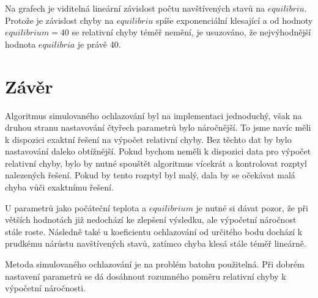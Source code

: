 \documentclass[10pt,a4paper]{article}
\begin{document}
Na grafech je viditelná lineární závislost počtu navštívených stavů na $equilibriu$. Protože je závislost chyby na $equilibriu$ spíše exponenciální klesající a od hodnoty $equilibrium = 40$ se relativní chyby téměř nemění, je usuzováno, že nejvýhodnější hodnota $equilibria$ je právě 40.

\section{Závěr}  
Algoritmus simulovaného ochlazování byl na implementaci jednoduchý, však na druhou stranu nastavování čtyřech parametrů bylo náročnější. To jsme navíc měli k dispozici exaktní řešení na výpočet relativní chyby. Bez těchto dat by bylo nastavování daleko obtížnější. Pokud bychom neměli k dispozici data pro výpočet relativní chyby, bylo by nutné spouštět algoritmus vícekrát a kontrolovat rozptyl nalezených řešení. Pokud by tento rozptyl byl malý, dala by se očekávat malá chyba vůči exaktnímu řešení.

U parametrů jako počáteční teplota a $equilibrium$ je nutné si dávat pozor, že při větších hodnotách již nedochází ke zlepšení výsledku, ale výpočetní náročnost stále roste. Následně také u koeficientu ochlazování od určitého bodu dochází k prudkému nárůstu navštívených stavů, zatímco chyba klesá stále téměř lineárně.

Metoda simulovaného ochlazování je na problém batohu použitelná. Při dobrém nastavení parametrů se dá dosáhnout rozumného poměru relativní chyby k výpočetní náročnosti.
\end{document}
